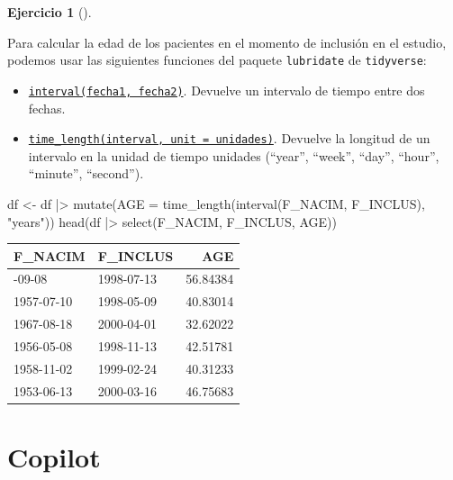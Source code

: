 \documentclass[
  a4paper,
]{scrreport}
\newenvironment{Shaded}{\begin{snugshade}}{\end{snugshade}}
\newcommand{\AttributeTok}[1]{\textcolor[rgb]{0.40,0.45,0.13}{#1}}
\newcommand{\FunctionTok}[1]{\textcolor[rgb]{0.28,0.35,0.67}{#1}}
\newcommand{\NormalTok}[1]{\textcolor[rgb]{0.00,0.23,0.31}{#1}}
\newcommand{\OtherTok}[1]{\textcolor[rgb]{0.00,0.23,0.31}{#1}}
\newcommand{\SpecialCharTok}[1]{\textcolor[rgb]{0.37,0.37,0.37}{#1}}
\newcommand{\StringTok}[1]{\textcolor[rgb]{0.13,0.47,0.30}{#1}}
\theoremstyle{definition}
\newtheorem{exercise}{Ejercicio}[chapter]
\theoremstyle{remark}
\begin{document}
\begin{exercise}[]
\begin{enumerate}
\begin{tcolorbox}
  Para calcular la edad de los pacientes en el momento de inclusión en
  el estudio, podemos usar las siguientes funciones del paquete
  \texttt{lubridate} de \texttt{tidyverse}:

  \begin{itemize}
  \item
    \href{https://lubridate.tidyverse.org/reference/interval.html}{\texttt{interval(fecha1,\ fecha2)}}.
    Devuelve un intervalo de tiempo entre dos fechas.
  \item
    \href{https://lubridate.tidyverse.org/reference/time_length.html}{\texttt{time\_length(interval,\ unit\ =\ unidades)}}.
    Devuelve la longitud de un intervalo en la unidad de tiempo unidades
    (``year'', ``week'', ``day'', ``hour'', ``minute'', ``second'').
  \end{itemize}

\begin{Shaded}
\begin{Highlighting}[]
\NormalTok{df }\OtherTok{\textless{}{-}}\NormalTok{ df }\SpecialCharTok{|\textgreater{}} \FunctionTok{mutate}\NormalTok{(}\AttributeTok{AGE =} \FunctionTok{time\_length}\NormalTok{(}\FunctionTok{interval}\NormalTok{(F\_NACIM, F\_INCLUS), }\StringTok{"years"}\NormalTok{))}
\FunctionTok{head}\NormalTok{(df }\SpecialCharTok{|\textgreater{}}  \FunctionTok{select}\NormalTok{(F\_NACIM, F\_INCLUS, AGE))}
\end{Highlighting}
\end{Shaded}

  \begin{longtable}[]{@{}llr@{}}
  \toprule\noalign{}
  F\_NACIM & F\_INCLUS & AGE \\
  \midrule\noalign{}
  \endhead
  \bottomrule\noalign{}
  \endlastfoot
  1941-09-08 & 1998-07-13 & 56.84384 \\
  1957-07-10 & 1998-05-09 & 40.83014 \\
  1967-08-18 & 2000-04-01 & 32.62022 \\
  1956-05-08 & 1998-11-13 & 42.51781 \\
  1958-11-02 & 1999-02-24 & 40.31233 \\
  1953-06-13 & 2000-03-16 & 46.75683 \\
  \end{longtable}

  \section{Copilot}


\end{tcolorbox}
\end{enumerate}
\end{exercise}
\end{document}
